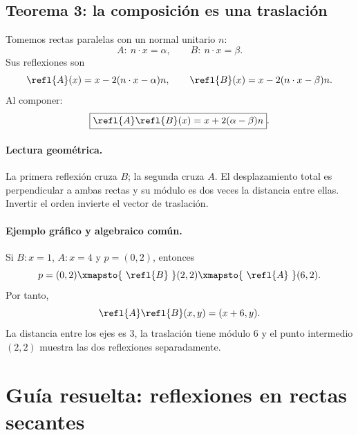 \subsection{Teorema 3: la composición es una traslación}

Tomemos rectas paralelas con un normal unitario \(n\):
\[
  A:\ n\cdot x=\alpha,
  \qquad
  B:\ n\cdot x=\beta.
\]
Sus reflexiones son
\[
  \refl{A}(x)=x-2(n\cdot x-\alpha)n,
  \qquad
  \refl{B}(x)=x-2(n\cdot x-\beta)n.
\]
Al componer:
\[
  \boxed{\refl{A}\refl{B}(x)=x+2(\alpha-\beta)n}.
\]

\begin{center}
\end{center}

\paragraph{Lectura geométrica.}
La primera reflexión cruza \(B\); la segunda cruza \(A\). El desplazamiento total es
perpendicular a ambas rectas y su módulo es dos veces la distancia entre ellas. Invertir el
orden invierte el vector de traslación.

\paragraph{Ejemplo gráfico y algebraico común.}
Si \(B:x=1\), \(A:x=4\) y \(p=(0,2)\), entonces
\[
  p=(0,2)
  \xmapsto{\ \refl{B}\ }(2,2)
  \xmapsto{\ \refl{A}\ }(6,2).
\]
Por tanto,
\[
  \refl{A}\refl{B}(x,y)=(x+6,y).
\]
La distancia entre los ejes es \(3\), la traslación tiene módulo \(6\) y el punto intermedio
\((2,2)\) muestra las dos reflexiones separadamente.

\section{Guía resuelta: reflexiones en rectas secantes}

